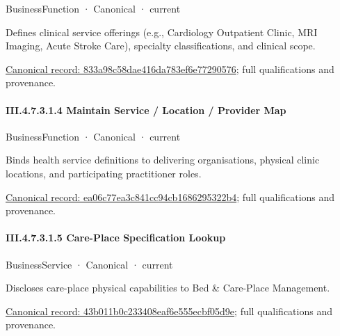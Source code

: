 \label{element:833a98c58dae416da783ef6e77290576}
{\small BusinessFunction · Canonical · current}\par

Defines clinical service offerings (e.g., Cardiology Outpatient Clinic, MRI Imaging, Acute Stroke Care), specialty classifications, and clinical scope.


{\footnotesize \href{../../../../../../../../continuum/business/business-function/833a98c58dae416da783ef6e77290576.md}{Canonical record: 833a98c58dae416da783ef6e77290576}; full qualifications and provenance.}\par
\paragraph*{III.4.7.3.1.4 Maintain Service / Location / Provider Map}
\label{navigation:III.4.7.3.1.4}

\label{element:ea06c77ea3c841cc94cb1686295322b4}
{\small BusinessFunction · Canonical · current}\par

Binds health service definitions to delivering organisations, physical clinic locations, and participating practitioner roles.


{\footnotesize \href{../../../../../../../../continuum/business/business-function/ea06c77ea3c841cc94cb1686295322b4.md}{Canonical record: ea06c77ea3c841cc94cb1686295322b4}; full qualifications and provenance.}\par
\paragraph*{III.4.7.3.1.5 Care-Place Specification Lookup}
\label{navigation:III.4.7.3.1.5}

\label{element:43b011b0c233408eaf6e555ecbf05d9e}
{\small BusinessService · Canonical · current}\par

Discloses care-place physical capabilities to Bed \& Care-Place Management.


{\footnotesize \href{../../../../../../../../continuum/business/business-service/43b011b0c233408eaf6e555ecbf05d9e.md}{Canonical record: 43b011b0c233408eaf6e555ecbf05d9e}; full qualifications and provenance.}\par
